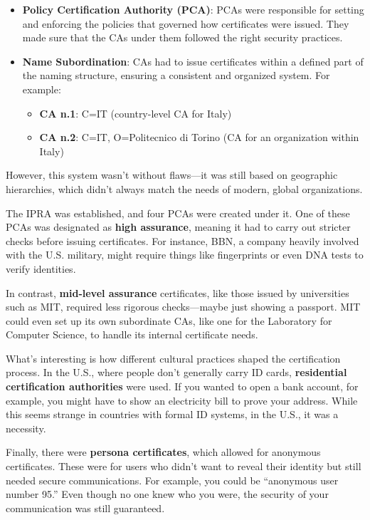 \begin{itemize}
  \item \textbf{Policy Certification Authority (PCA)}: PCAs were
    responsible for setting and enforcing the policies that governed
    how certificates were issued. They made sure that the CAs under
    them followed the right security practices.
  
  \item \textbf{Name Subordination}: CAs had to issue certificates
    within a defined part of the naming structure, ensuring a
    consistent and organized system. For example:
  \begin{itemize}
      \item \textbf{CA n.1}: C=IT (country-level CA for Italy)
      \item \textbf{CA n.2}: C=IT, O=Politecnico di Torino (CA for an
        organization within Italy)
  \end{itemize}
\end{itemize}


 However, this system wasn’t without flaws—it
was still based on geographic hierarchies, which didn’t always match
the needs of modern, global organizations.

The IPRA was established, and four PCAs were created under it. One of
these PCAs was designated as \textbf{high assurance}, meaning it had
to carry out stricter checks before issuing certificates. For
instance, BBN, a company heavily involved with the U.S. military,
might require things like fingerprints or even DNA tests to verify
identities.

In contrast, \textbf{mid-level assurance} certificates, like those
issued by universities such as MIT, required less rigorous
checks—maybe just showing a passport. MIT could even set up its own
subordinate CAs, like one for the Laboratory for Computer Science, to
handle its internal certificate needs.

What’s interesting is how different cultural practices shaped the
certification process. In the U.S., where people don’t generally carry
ID cards, \textbf{residential certification authorities} were used. If
you wanted to open a bank account, for example, you might have to show
an electricity bill to prove your address. While this seems strange in
countries with formal ID systems, in the U.S., it was a necessity.

Finally, there were \textbf{persona certificates}, which allowed for
anonymous certificates. These were for users who didn’t want to reveal
their identity but still needed secure communications. For example,
you could be “anonymous user number 95.” Even though no one knew who
you were, the security of your communication was still guaranteed.

